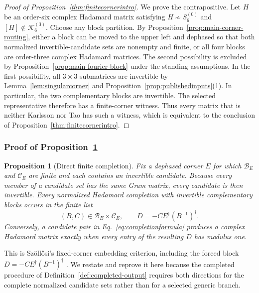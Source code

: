 \documentclass[aps,prx,reprint,nofootinbib,twoside,superscriptaddress,longbibliography,floatfix]{revtex4-2}
\newtheorem{proposition}[theorem]{Proposition}
\theoremstyle{definition}
\newcommand{\KK}{\mathcal K}
\begin{document}
\begin{proof}[Proof of Proposition~\ref{thm:finitecornerintro}]
{We prove the contrapositive. Let $H$ be an order-six complex Hadamard matrix satisfying $H\not\sim S_6^{(0)}$ and $[H]\notin\KK_6^{(3)}$. Choose any block partition. By Proposition~\ref{prop:main-corner-routing}, either a block can be moved to the upper left and dephased so that both normalized invertible-candidate sets are nonempty and finite, or all four blocks are order-three complex Hadamard matrices. The second possibility is excluded by Proposition~\ref{prop:main-fourier-block} under the standing assumptions. In the first possibility, all $3\times3$ submatrices are invertible by Lemma~\ref{lem:singularcorner} and Proposition~\ref{prop:publishedinputs}(1). In particular, the two complementary blocks are invertible. The selected representative therefore has a finite-corner witness. Thus every matrix that is neither Karlsson nor Tao has such a witness, which is equivalent to the conclusion of Proposition~\ref{thm:finitecornerintro}.}
\end{proof}

\subsubsection{{Proof of Proposition~\ref{prop:directcompletion}}}

\begin{proposition}[Direct finite completion]
\label{prop:directcompletion}
Fix a dephased corner $E$ for which $\mathcal B_E$ and $\mathcal C_E$ are finite and each contains an invertible candidate.  Because every member of a candidate set has the same Gram matrix, every candidate is then invertible. Every normalized Hadamard completion with invertible complementary blocks occurs in the finite list
\begin{equation}
(B,C)\in\mathcal B_E\times\mathcal C_E,
\qquad
D=-CE^{\dagger}(B^{-1})^{\dagger}.
\label{eq:completionformula}
\end{equation}
Conversely, a candidate pair in Eq.~\eqref{eq:completionformula} produces a complex Hadamard matrix exactly when every entry of the resulting $D$ has modulus one.
\end{proposition}

This is Sz\"oll\H{o}si's fixed-corner embedding criterion, including the forced block $D=-CE^{\dagger}(B^{-1})^{\dagger}$ \MainCiteSzollosi. We restate and reprove it here because the completed procedure of Definition~\ref{def:completed-output} requires both directions for the complete normalized candidate sets rather than for a selected generic branch.
\end{document}
